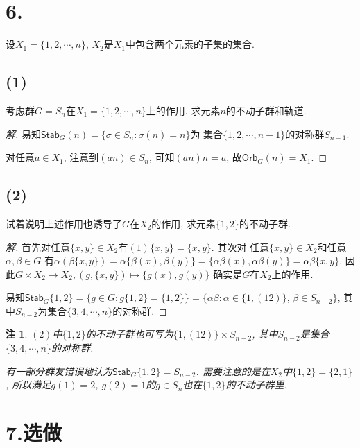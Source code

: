 \documentclass[12pt, a4paper, fontset=windows]{ctexart}
\newcommand{\Orb}{\mathsf{Orb}}
\newcommand{\Stab}{\mathsf{Stab}}
\newcommand{\xuan}{{\normalsize 选做}}
\newtheorem*{remark}{注}
\newenvironment{solution}{\begin{proof}[解]}{\end{proof}}
\begin{document}
\section*{6.}

设$X_1=\{1,2,\cdots,n\}$, $X_2$是$X_1$中包含两个元素的子集的集合. 

\subsection*{(1)}

考虑群$G=S_n$在$X_1=\{1,2,\cdots,n\}$上的作用. 求元素$n$的不动子群和轨道. 

\begin{solution}
易知$\Stab_G(n)=\{\sigma\in S_n:\sigma(n)=n\}$为
集合$\{1,2,\cdots,n-1\}$的对称群$S_{n-1}$. 

对任意$a\in X_1$, 注意到$(an)\in S_n$, 
可知$(an)n=a$, 故$\Orb_G(n)=X_1$. 
\end{solution}

\subsection*{(2)}

试着说明上述作用也诱导了$G$在$X_2$的作用, 求元素$\{1,2\}$的不动子群. 

\begin{solution}
首先对任意$\{x,y\}\in X_2$有$(1)\{x,y\}=\{x,y\}$. 其次对
任意$\{x,y\}\in X_2$和任意$\alpha,\beta\in G$
有$\alpha(\beta\{x,y\})=\alpha\{\beta(x),\beta(y)\}
=\{\alpha\beta(x),\alpha\beta(y)\}=\alpha\beta\{x,y\}$. 
因此$G\times X_2\to X_2,(g,\{x,y\})\mapsto\{g(x),g(y)\}$
确实是$G$在$X_2$上的作用. 

易知$\Stab_G\{1,2\}=\{g\in G:g\{1,2\}=\{1,2\}\}
=\{\alpha\beta:\alpha\in\{1,(12)\}$, $\beta\in S_{n-2}\}$, 
其中$S_{n-2}$为集合$\{3,4,\cdots,n\}$的对称群. 
\end{solution}

\begin{remark}
$(2)$中$\{1,2\}$的不动子群也可写为$\{1,(12)\}\times S_{n-2}$, 
其中$S_{n-2}$是集合$\{3,4,\cdots,n\}$的对称群. 

有一部分群友错误地认为$\Stab_G{\{1,2\}}=S_{n-2}$. 
需要注意的是在$X_2$中$\{1,2\}=\{2,1\}$, 所以满足$g(1)=2$, 
$g(2)=1$的$g\in S_n$也在$\{1,2\}$的不动子群里. 
\end{remark}

\section*{7.\xuan}
\end{document}
